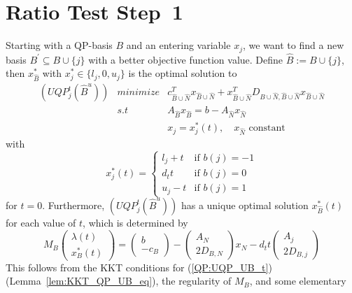 \documentclass[a4paper]{article}
\begin{document}
\section{Ratio Test Step~1}
Starting with a QP-basis $B$ and an entering variable $x_{j}$, we want to find a
new basis $B^{\prime} \subseteq B \cup \{j\}$ with a better objective function
value. Define $\hat{B}:=B \cup \{j\}$, then $x_{\hat{B}}^{*}$ with
$x_{j}^{*} \in \{l_{j}, 0, u_{j}\}$ is the optimal solution to
\begin{eqnarray}
\label{QP:UQP_UB_t}
(UQP_{j}^{t}(\hat{B}^{u})) & minimize &
  c_{\hat{B} \cup \hat{N}}^{T}x_{\hat{B} \cup \hat{N}}
  + x_{\hat{B} \cup \hat{N}}^{T}
  D_{\hat{B} \cup \hat{N},\hat{B} \cup \hat{N}}
  x_{\hat{B} \cup \hat{N}}  \nonumber \\
  & s.t & A_{\hat{B}}x_{\hat{B}} =
  b - A_{\hat{N}}x_{\hat{N}} \\
  & & x_{j} = x_{j}^{*}(t), \quad x_{\hat{N}} \text{ constant}
  \nonumber
\end{eqnarray}
with
\begin{equation}
x_{j}^{*}(t)=
\left\{
\begin{array}{ll}
l_{j}+t
&
\text{if $b(j)=-1$} \\
d_{t}t
&
\text{if $b(j)=0$} \\
u_{j}-t
&
\text{if $b(j)=1$}
\end{array}
\right.
\end{equation}
for $t=0$. Furthermore, $(UQP_{j}^{t}(\hat{B}^{u}))$ has a unique optimal
solution $x_{\hat{B}}^{*}(t)$ for each value of $t$, which is determined by
\begin{equation}
M_{B}
\left(
\begin{array}{c}
\lambda(t) \\
\hline
x_{B}^{*}(t)
\end{array}
\right)
=
\left(
\begin{array}{c}
b \\
\hline
-c_{B}
\end{array}
\right)
-
\left(
\begin{array}{c}
A_{N} \\
\hline
2D_{B, N}
\end{array}
\right)
x_{N}
-d_{t}t
\left(
\begin{array}{c}
A_{j} \\
\hline
2D_{B, j}
\end{array}
\right)
\end{equation}
This follows from the KKT conditions for (\ref{QP:UQP_UB_t})
(Lemma~\ref{lem:KKT_QP_UB_eq}), the regularity of $M_{B}$, and some elementary
\end{document}
